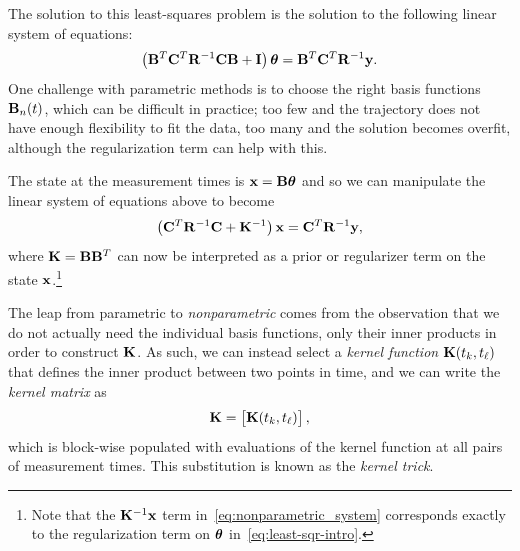 The solution to this least-squares problem is the solution to the following linear system of equations:
\begin{equation}
\left( \mathbf{B}^T \mathbf{C}^T \mathbf{R}^{-1} \mathbf{C} \mathbf{B} + \mathbf{I} \right) {\boldsymbol{\theta}} = \mathbf{B}^T\mathbf{C}^T \mathbf{R}^{-1} \mathbf{y}.
\end{equation}
One challenge with parametric methods is to choose the right basis functions $\mathbf{B}_n(t)$, which can be difficult in practice; too few and the trajectory does not have enough flexibility to fit the data, too many and the solution becomes overfit, although the regularization term can help with this.  

The state at the measurement times is $\mathbf{x} = \mathbf{B} {\boldsymbol{\theta}}$ and so we can manipulate the linear system of equations above to become
\begin{equation}\label{eq:nonparametric_system}
\left( \mathbf{C}^T \mathbf{R}^{-1} \mathbf{C} + \mathbf{K}^{-1} \right) \mathbf{x} = \mathbf{C}^T \mathbf{R}^{-1} \mathbf{y},
\end{equation}
where $\mathbf{K} = \mathbf{B}\mathbf{B}^T$ can now be interpreted as a prior or regularizer term on the state $\mathbf{x}$.\footnote{Note that the $\mathbf{K}^{-1}\mathbf{x} $ term in~\eqref{eq:nonparametric_system} corresponds exactly to the regularization term on ${\boldsymbol{\theta}}$ in~\eqref{eq:least-sqr-intro}.}

The leap from parametric to {\em nonparametric} comes from the observation that we do not actually need the individual basis functions, only their inner products in order to construct $\mathbf{K}$. As such, we can instead select a {\em kernel function} $\mathbf{K}(t_k, t_\ell)$ that defines the inner product between two points in time, and we can write the {\em kernel matrix} as
\begin{equation}
\mathbf{K} = \begin{bmatrix} \mathbf{K}(t_k, t_\ell)\end{bmatrix},
\end{equation}
which is block-wise populated with evaluations of the kernel function at all pairs of measurement times.  This substitution is known as the {\em kernel trick}.  

